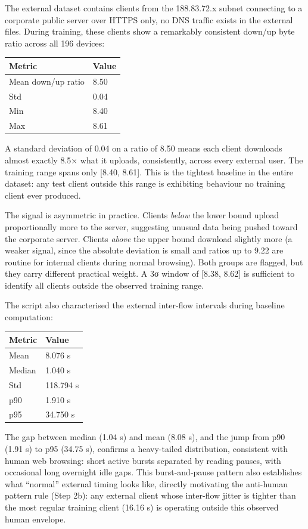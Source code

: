 \documentclass[
  11pt,
]{article}
\begin{document}
The external dataset contains clients from the 188.83.72.x subnet
connecting to a corporate public server over HTTPS only, no DNS traffic
exists in the external files. During training, these clients show a
remarkably consistent down/up byte ratio across all 196 devices:

\begin{longtable}[]{@{}ll@{}}
\toprule\noalign{}
Metric & Value \\
\midrule\noalign{}
\endhead
\bottomrule\noalign{}
\endlastfoot
Mean down/up ratio & 8.50 \\
Std & 0.04 \\
Min & 8.40 \\
Max & 8.61 \\
\end{longtable}

A standard deviation of 0.04 on a ratio of 8.50 means each client
downloads almost exactly 8.5× what it uploads, consistently, across
every external user. The training range spans only {[}8.40, 8.61{]}.
This is the tightest baseline in the entire dataset: any test client
outside this range is exhibiting behaviour no training client ever
produced.

The signal is asymmetric in practice. Clients \emph{below} the lower
bound upload proportionally more to the server, suggesting unusual data being pushed toward the
corporate server. Clients \emph{above} the upper bound download
slightly more (a weaker signal, since the absolute deviation is small
and ratios up to 9.22 are routine for internal clients during normal
browsing). Both groups are flagged, but they carry different practical
weight. A 3σ window of {[}8.38, 8.62{]} is sufficient to identify all
clients outside the observed training range.

The script also characterised the external inter-flow intervals during
baseline computation:

\begin{longtable}[]{@{}ll@{}}
\toprule\noalign{}
Metric & Value \\
\midrule\noalign{}
\endhead
\bottomrule\noalign{}
\endlastfoot
Mean & 8.076 s \\
Median & 1.040 s \\
Std & 118.794 s \\
p90 & 1.910 s \\
p95 & 34.750 s \\
\end{longtable}

The gap between median (1.04 s) and mean (8.08 s), and the jump from p90
(1.91 s) to p95 (34.75 s), confirms a heavy-tailed distribution, consistent
with human web browsing: short active bursts separated by reading
pauses, with occasional long overnight idle gaps. This burst-and-pause
pattern also establishes what ``normal'' external timing looks like,
directly motivating the anti-human pattern rule (Step 2b): any external
client whose inter-flow jitter is tighter than the most regular training
client (16.16 s) is operating outside this observed human envelope.
\end{document}

